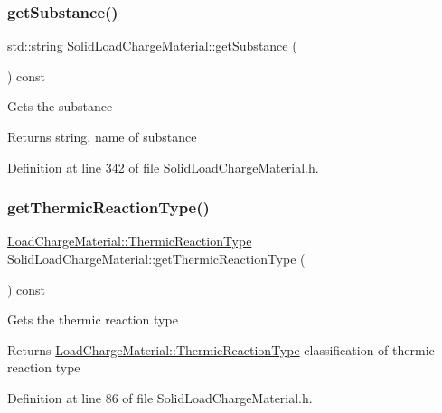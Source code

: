 \subsubsection{\texorpdfstring{get\+Substance()}{getSubstance()}\hspace{0.1cm}{\footnotesize\ttfamily [3/3]}}
{\footnotesize\ttfamily std\+::string Solid\+Load\+Charge\+Material\+::get\+Substance (\begin{DoxyParamCaption}{ }\end{DoxyParamCaption}) const\hspace{0.3cm}{\ttfamily [inline]}}

Gets the substance \begin{DoxyReturn}{Returns}
string, name of substance 
\end{DoxyReturn}


Definition at line 342 of file Solid\+Load\+Charge\+Material.\+h.

\mbox{\label{class_solid_load_charge_material_a11708312a99ab985d980e1e521e0864c}} 
\subsubsection{\texorpdfstring{get\+Thermic\+Reaction\+Type()}{getThermicReactionType()}\hspace{0.1cm}{\footnotesize\ttfamily [1/3]}}
{\footnotesize\ttfamily \hyperlink{namespace_load_charge_material_a51d4263e865a5d86236622dd3fe23fd1}{Load\+Charge\+Material\+::\+Thermic\+Reaction\+Type} Solid\+Load\+Charge\+Material\+::get\+Thermic\+Reaction\+Type (\begin{DoxyParamCaption}{ }\end{DoxyParamCaption}) const\hspace{0.3cm}{\ttfamily [inline]}}

Gets the thermic reaction type \begin{DoxyReturn}{Returns}
\hyperlink{namespace_load_charge_material_a51d4263e865a5d86236622dd3fe23fd1}{Load\+Charge\+Material\+::\+Thermic\+Reaction\+Type} classification of thermic reaction type 
\end{DoxyReturn}


Definition at line 86 of file Solid\+Load\+Charge\+Material.\+h.

